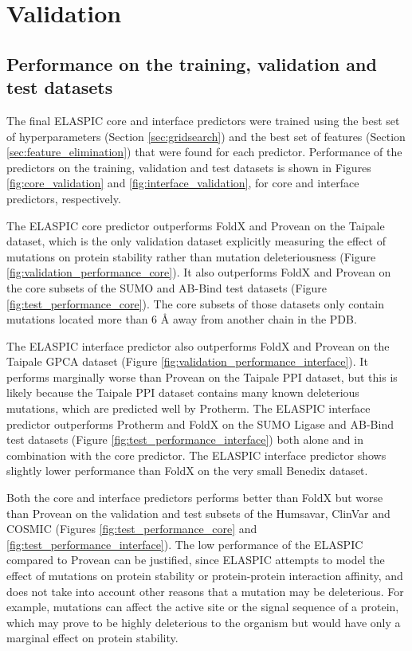 \clearpage
\section{Validation} \label{sec:validation}

\subsection{Performance on the training, validation and test datasets}

The final ELASPIC core and interface predictors were trained using the best set of hyperparameters (Section \ref{sec:gridsearch}) and the best set of features (Section \ref{sec:feature_elimination}) that were found for each predictor. Performance of the predictors on the training, validation and test datasets is shown in Figures \ref{fig:core_validation} and \ref{fig:interface_validation}, for core and interface predictors, respectively.

The ELASPIC core predictor outperforms FoldX and Provean on the Taipale dataset, which is the only validation dataset explicitly measuring the effect of mutations on protein stability rather than mutation deleteriousness (Figure \ref{fig:validation_performance_core}). It also outperforms FoldX and Provean on the core subsets of the SUMO and AB-Bind test datasets (Figure \ref{fig:test_performance_core}). The core subsets of those datasets only contain mutations located more than 6 {\AA} away from another chain in the PDB.

The ELASPIC interface predictor also outperforms FoldX and Provean on the Taipale GPCA dataset (Figure \ref{fig:validation_performance_interface}). It performs marginally worse than Provean on the Taipale PPI dataset, but this is likely because the Taipale PPI dataset contains many known deleterious mutations, which are predicted well by Protherm. The ELASPIC interface predictor outperforms Protherm and FoldX on the SUMO Ligase and AB-Bind test datasets (Figure \ref{fig:test_performance_interface}) both alone and in combination with the core predictor. The ELASPIC interface predictor shows slightly lower performance than FoldX on the very small Benedix dataset.

Both the core and interface predictors performs better than FoldX but worse than Provean on the validation and test subsets of the Humsavar, ClinVar and COSMIC (Figures \ref{fig:test_performance_core} and \ref{fig:test_performance_interface}). The low performance of the ELASPIC compared to Provean can be justified, since ELASPIC attempts to model the effect of mutations on protein stability or protein-protein interaction affinity, and does not take into account other reasons that a mutation may be deleterious. For example, mutations can affect the active site or the signal sequence of a protein, which may prove to be highly deleterious to the organism but would have only a marginal effect on protein stability.

